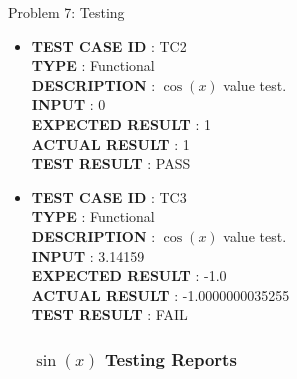 \documentclass[a4paper,12pt]{article}
\begin{document}
\begin{section}{Problem 7: Testing}
\begin{itemize}
	\item \textbf{TEST CASE ID} \hspace{1.25cm} : TC2  \\
	\textbf{TYPE } \hspace{3.15cm}  : Functional\\
	\textbf{DESCRIPTION }\hspace{1.25cm} : $\cos(x)$ value test. \\
	\textbf{INPUT} \hspace{3.05cm} :  0 \\
	\textbf{EXPECTED RESULT} \hspace{0.01cm} : 1 \\
	\textbf{ACTUAL RESULT} \hspace{0.6cm} : 1 \\
	\textbf{TEST RESULT} \hspace{1.40cm} : PASS \\	
	
	\item \textbf{TEST CASE ID} \hspace{1.25cm} : TC3  \\
	\textbf{TYPE } \hspace{3.15cm}  : Functional\\
	\textbf{DESCRIPTION }\hspace{1.25cm} : $\cos(x)$ value test. \\
	\textbf{INPUT} \hspace{3.05cm} :  3.14159 \\
	\textbf{EXPECTED RESULT} \hspace{0.01cm} : -1.0 \\
	\textbf{ACTUAL RESULT} \hspace{0.6cm} : -1.0000000035255 \\
	\textbf{TEST RESULT} \hspace{1.40cm} : FAIL \\
	
	

\subsubsection{$\sin(x)$ Testing Reports}
	

\end{itemize}
\end{section}
\end{document}
